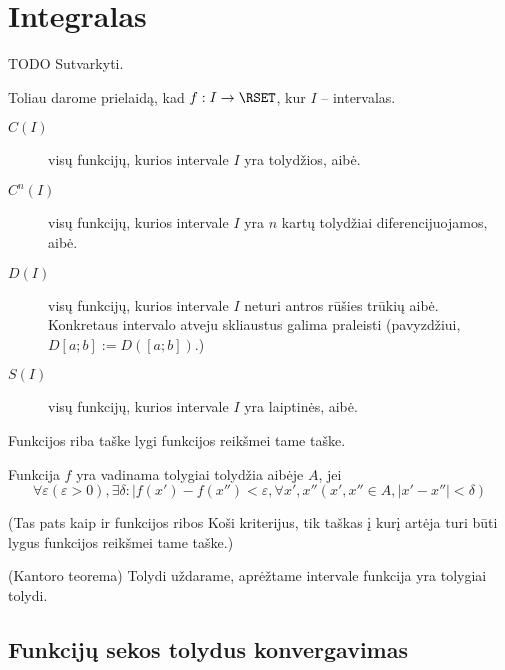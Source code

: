 \chapter{Integralas}

TODO Sutvarkyti.

\begin{note}
  Toliau darome prielaidą, kad $f: I \to \RSET$, kur $I$ – intervalas.
\end{note}

\begin{notation}
  \begin{description}
    \item[$C(I)$] visų funkcijų, kurios intervale $I$ yra tolydžios, aibė.
    \item[$C^{n}(I)$] visų funkcijų, kurios intervale $I$ yra $n$ kartų 
      tolydžiai diferencijuojamos, aibė.
    \item[$D(I)$] visų funkcijų, kurios intervale $I$ neturi antros rūšies 
      trūkių aibė. Konkretaus intervalo atveju skliaustus galima praleisti
      (pavyzdžiui, $D[a; b] := D([a; b])$.)
    \item[$S(I)$] visų funkcijų, kurios intervale $I$ yra laiptinės, aibė.
  \end{description}
\end{notation}

\begin{defn}
  Funkcijos riba taške lygi funkcijos reikšmei tame taške.
\end{defn}

\begin{defn}
  Funkcija $f$ yra vadinama tolygiai tolydžia aibėje $A$, jei
  \begin{equation*}
    \forall \varepsilon (\varepsilon > 0), \exists \delta : %
    | f(x') - f(x'') < \varepsilon, %
    \forall x', x'' (x', x'' \in A, |x' - x''| < \delta)
  \end{equation*}

  (Tas pats kaip ir funkcijos ribos Koši kriterijus, tik taškas į kurį
  artėja turi būti lygus funkcijos reikšmei tame taške.)
\end{defn}

\begin{prop}
  (Kantoro teorema) Tolydi  uždarame, aprėžtame intervale funkcija yra
  tolygiai tolydi.
\end{prop}

\section{Funkcijų sekos tolydus konvergavimas}

